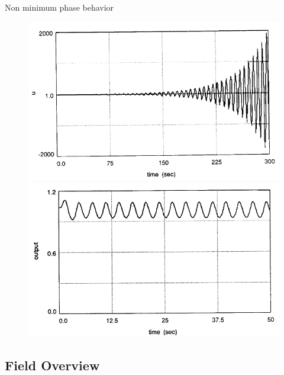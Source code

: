 \begin{frame}{Non minimum phase behavior \autocite{Jeff1992}}
    \begin{figure}[!htb]
	\centering
	\begin{minipage}{0.45\textwidth}
	\includegraphics[scale=0.2]{img/nonmin.png}
	\caption{}
	\end{minipage} \hfill
	\begin{minipage}{0.45\textwidth}
	\includegraphics[scale=0.2]{img/nonmin2.png}
	\caption{}
	\end{minipage}
\end{figure} 
\end{frame}


\subsection{Field Overview}

